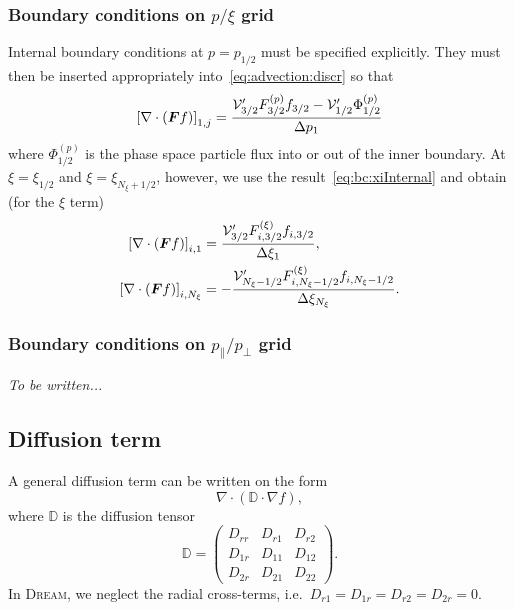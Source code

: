 \documentclass{notes}
\newcommand{\DREAM}{\textsc{Dream}}
\newcommand{\Vp}{\mathcal{V}'}
\begin{document}
    \subsubsection{Boundary conditions on $p/\xi$ grid}
    Internal boundary conditions at $p=p_{1/2}$ must be specified explicitly.
    They must then be inserted appropriately into~\eqref{eq:advection:discr} so
    that
    \begin{equation}
        \left[ \nabla\cdot\left( \bb{F}f \right) \right]_{1,j} = \frac{
            \Vp_{3/2} F_{3/2}^{(p)} f_{3/2} - \Vp_{1/2}\Phi^{(p)}_{1/2}
        }{\Delta p_{1}}
    \end{equation}
    where $\Phi_{1/2}^{(p)}$ is the phase space particle flux into or out of
    the inner boundary. At $\xi=\xi_{1/2}$ and $\xi=\xi_{N_\xi+1/2}$, however,
    we use the result~\eqref{eq:bc:xiInternal} and obtain (for the $\xi$ term)
    \begin{equation}
        \begin{aligned}
            \left[ \nabla\cdot\left( \bb{F} f \right) \right]_{i,1} &=
                \frac{\Vp_{3/2} F^{(\xi)}_{i,3/2} f_{i,3/2}}{\Delta\xi_{1}},\\
            \left[ \nabla\cdot\left( \bb{F} f \right) \right]_{i,N_\xi} &=
                -\frac{\Vp_{N_\xi-1/2} F^{(\xi)}_{i,N_\xi-1/2} f_{i,N_\xi-1/2}}{\Delta\xi_{N_\xi}}.
        \end{aligned}
    \end{equation}

    \subsubsection{Boundary conditions on $p_\parallel / p_\perp$ grid}
    \emph{To be written...}

    \subsection{Diffusion term}\label{sec:diffusion}
    A general diffusion term can be written on the form
    \begin{equation*}
        \nabla\cdot\left( \mathbb{D}\cdot\nabla f \right),
    \end{equation*}
    where $\mathbb{D}$ is the diffusion tensor
    \begin{equation*}
        \mathbb{D} = \begin{pmatrix}
            D_{rr} & D_{r1} & D_{r2} \\
            D_{1r} & D_{11} & D_{12} \\
            D_{2r} & D_{21} & D_{22}
        \end{pmatrix}.
    \end{equation*}
    In \DREAM, we neglect the radial cross-terms, i.e.\
    $D_{r1} = D_{1r} = D_{r2} = D_{2r} = 0$.
\end{document}
